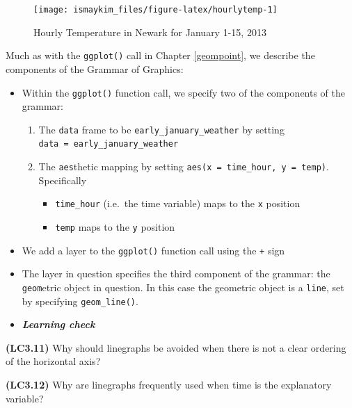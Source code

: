 \documentclass[12pt,]{krantz}
\providecommand{\tightlist}{%
  \setlength{\itemsep}{0pt}\setlength{\parskip}{0pt}}
\newenvironment{rmdblock}[1]
  {\begin{shaded*}
  \begin{itemize}
  \renewcommand{\labelitemi}{
    \raisebox{-.7\height}[0pt][0pt]{
    }
  }
  \item
  }
  {
  \end{itemize}
  \end{shaded*}
  }
\newenvironment{learncheck}
  {\begin{rmdblock}{warning}}
  {\end{rmdblock}}
\theoremstyle{definition}
\theoremstyle{definition}
\theoremstyle{definition}
\theoremstyle{remark}
\begin{document}
\begin{figure}

{\centering \texttt{[image: ismaykim\_files/figure-latex/hourlytemp-1]} 

}

\caption{Hourly Temperature in Newark for January 1-15, 2013}\label{fig:hourlytemp}
\end{figure}

Much as with the \texttt{ggplot()} call in Chapter \ref{geompoint}, we
describe the components of the Grammar of Graphics:

\begin{itemize}
\tightlist
\item
  Within the \texttt{ggplot()} function call, we specify two of the
  components of the grammar:

  \begin{enumerate}
  \def\labelenumi{\arabic{enumi}.}
  \tightlist
  \item
    The \texttt{data} frame to be \texttt{early\_january\_weather} by
    setting \texttt{data\ =\ early\_january\_weather}
  \item
    The \texttt{aes}thetic mapping by setting
    \texttt{aes(x\ =\ time\_hour,\ y\ =\ temp)}. Specifically

    \begin{itemize}
    \tightlist
    \item
      \texttt{time\_hour} (i.e.~the time variable) maps to the
      \texttt{x} position
    \item
      \texttt{temp} maps to the \texttt{y} position
    \end{itemize}
  \end{enumerate}
\item
  We add a layer to the \texttt{ggplot()} function call using the
  \texttt{+} sign
\item
  The layer in question specifies the third component of the grammar:
  the \texttt{geom}etric object in question. In this case the geometric
  object is a \texttt{line}, set by specifying \texttt{geom\_line()}.
\end{itemize}

\begin{learncheck}
\textbf{\emph{Learning check}}
\end{learncheck}

\textbf{(LC3.11)} Why should linegraphs be avoided when there is not a
clear ordering of the horizontal axis?

\textbf{(LC3.12)} Why are linegraphs frequently used when time is the
explanatory variable?
\end{document}
